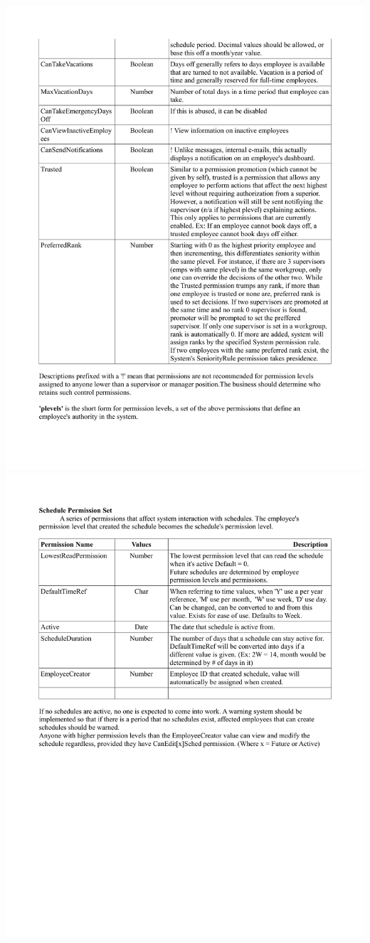 \documentclass[letterpaper,12pt]{report}
\begin{document}
\includegraphics[scale=0.8, trim=20mm 0mm 0mm 0mm]{externals/PermissionTable2.pdf}
\newpage
\includegraphics[scale=0.8, trim=20mm 0mm 0mm 0mm]{externals/PermissionTable3.pdf}
\end{document}
